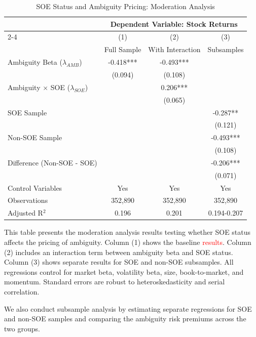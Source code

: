 \documentclass[preprint,12pt,authoryear]{elsarticle}
\begin{document}
\begin{table}[htbp]
\centering
\caption{SOE Status and Ambiguity Pricing: Moderation Analysis}
\label{tab:soe_moderation}
\begin{threeparttable}
\begin{tabular*}{\textwidth}{@{\extracolsep{\fill}} lccc @{\extracolsep{\fill}}}
\toprule
& \multicolumn{3}{c}{Dependent Variable: Stock Returns} \\
\cmidrule(lr){2-4}
& (1) & (2) & (3) \\
& Full Sample & With Interaction & Subsamples \\
\midrule
\midrule
Ambiguity Beta ($\lambda_{AMB}$) & -0.418*** & -0.493*** &  \\
& (0.094) & (0.108) &  \\
\midrule
Ambiguity $\times$ SOE ($\lambda_{SOE}$) & & 0.206*** &  \\
& & (0.065) &  \\
\midrule
SOE Sample & & & -0.287** \\
& & & (0.121) \\
\midrule
Non-SOE Sample & & & -0.493*** \\
& & & (0.108) \\
\midrule
Difference (Non-SOE - SOE) & & & -0.206*** \\
& & & (0.071) \\
\midrule
Control Variables & Yes & Yes & Yes \\
\midrule
Observations & 352,890 & 352,890 & 352,890 \\
Adjusted R$^2$ & 0.196 & 0.201 & 0.194-0.207 \\
\bottomrule
\end{tabular*}
\begin{tablenotes}[flushleft]
\small
\item[] This table presents the moderation analysis results testing whether SOE status affects the pricing of ambiguity. Column (1) shows the baseline \textcolor{red}{results}. Column (2) includes an interaction term between ambiguity beta and SOE status. Column (3) shows separate results for SOE and non-SOE subsamples. All regressions control for market beta, volatility beta, size, book-to-market, and momentum. Standard errors are robust to heteroskedasticity and serial correlation.
\end{tablenotes}
\end{threeparttable}
\end{table}

We also conduct subsample analysis by estimating separate regressions for SOE and non-SOE samples and comparing the ambiguity risk premiums across the two groups.
 
\end{document}
